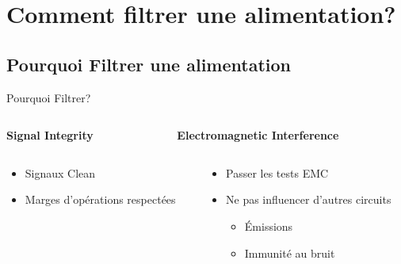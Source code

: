 
\section{Comment filtrer une alimentation?}

\subsection{Pourquoi Filtrer une alimentation}

\begin{frame}{Pourquoi Filtrer?}
    \vspace{-36pt}
    \begin{columns}
        \begin{column}{0.5\textwidth}
            \begin{center}
                \textbf{Signal Integrity}
            \end{center}
        \end{column}
        \begin{column}{0.5\textwidth}
            \begin{center}
                \textbf{Electromagnetic Interference}
            \end{center}
        \end{column}
    \end{columns}

    \begin{columns}
        \begin{column}{0.5\textwidth}
            \begin{itemize}
                \item Signaux Clean
                \item Marges d'opérations respectées
            \end{itemize}
        \end{column}
        \begin{column}{0.5\textwidth}
            \begin{itemize}
                \item Passer les tests EMC
                \item Ne pas influencer d'autres circuits
                \begin{itemize}
                    \item Émissions
                    \item Immunité au bruit
                \end{itemize}
            \end{itemize}
        \end{column}
    \end{columns}


\end{frame}
